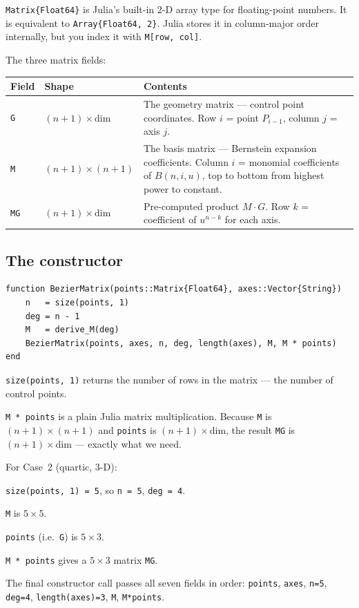 \documentclass[12pt, a4paper]{article}
\newcommand{\cd}[1]{\texttt{#1}}
\begin{document}
\cd{Matrix\{Float64\}} is Julia's built-in 2-D array type
for floating-point numbers.
It is equivalent to \cd{Array\{Float64, 2\}}.
Julia stores it in column-major order internally, but you
index it with \cd{M[row, col]}.

The three matrix fields:

\begin{center}
\begin{tabular}{llp{7cm}}
\toprule
Field & Shape & Contents \\
\midrule
\cd{G} & $(n+1) \times \text{dim}$ &
  The geometry matrix --- control point coordinates.
  Row $i$ = point $P_{i-1}$, column $j$ = axis $j$. \\[4pt]
\cd{M} & $(n+1) \times (n+1)$ &
  The basis matrix --- Bernstein expansion coefficients.
  Column $i$ = monomial coefficients of $B(n,i,u)$,
  top to bottom from highest power to constant. \\[4pt]
\cd{MG} & $(n+1) \times \text{dim}$ &
  Pre-computed product $M \cdot G$.
  Row $k$ = coefficient of $u^{n-k}$ for each axis. \\
\bottomrule
\end{tabular}
\end{center}

\subsection{The constructor}

\begin{verbatim}
function BezierMatrix(points::Matrix{Float64}, axes::Vector{String})
    n   = size(points, 1)
    deg = n - 1
    M   = derive_M(deg)
    BezierMatrix(points, axes, n, deg, length(axes), M, M * points)
end
\end{verbatim}

\cd{size(points, 1)} returns the number of rows in the matrix ---
the number of control points.

\cd{M * points} is a plain Julia matrix multiplication.
Because \cd{M} is $(n+1) \times (n+1)$ and \cd{points} is
$(n+1) \times \text{dim}$, the result \cd{MG} is
$(n+1) \times \text{dim}$ --- exactly what we need.

\begin{examplebox}
For Case~2 (quartic, 3-D):

\cd{size(points, 1) = 5}, so \cd{n = 5}, \cd{deg = 4}.

\cd{M} is $5 \times 5$.

\cd{points} (i.e.\ \cd{G}) is $5 \times 3$.

\cd{M * points} gives a $5 \times 3$ matrix \cd{MG}.

The final constructor call passes all seven fields in order:
\cd{points}, \cd{axes}, \cd{n=5}, \cd{deg=4},
\cd{length(axes)=3}, \cd{M}, \cd{M*points}.
\end{examplebox}
\end{document}
